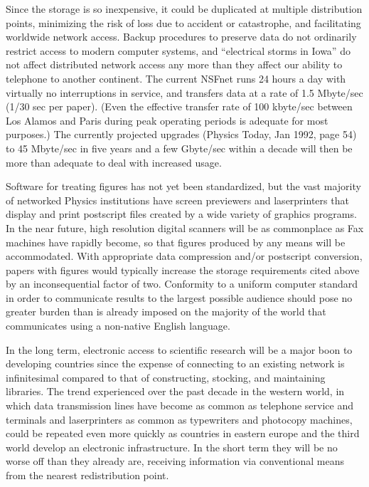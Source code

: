 Since the storage is so inexpensive, it could be duplicated at multiple
distribution points, minimizing the risk of loss due to accident or
catastrophe, and facilitating worldwide network access. Backup procedures
to preserve data do not ordinarily restrict access to modern computer
systems, and ``electrical storms in Iowa'' do not affect distributed
network access any more than they affect our ability to telephone to
another continent. The current NSFnet runs 24 hours a day with virtually
no interruptions in service, and transfers data at a rate of 1.5 Mbyte/sec
(1/30 sec per paper). (Even the effective transfer rate of 100 kbyte/sec
between Los Alamos and Paris during peak operating periods is adequate for
most purposes.) The currently projected upgrades (Physics Today, Jan 1992,
page 54) to 45 Mbyte/sec in five years and a few Gbyte/sec within a decade
will then be more than adequate to deal with increased usage.

Software for treating figures has not yet been standardized, but the vast
majority of networked Physics institutions have screen previewers and
laserprinters that display and print postscript files created by a wide
variety of graphics programs. In the near future, high resolution digital
scanners will be as commonplace as Fax machines have rapidly become, so
that figures produced by any means will be accommodated. With appropriate
data compression and/or postscript conversion, papers with figures would
typically increase the storage requirements cited above by an
inconsequential factor of two. Conformity to a uniform computer
standard in order to communicate results to the largest possible audience
should pose no greater burden than is already imposed on the majority of
the world that communicates using a non-native English language.

In the long term, electronic access to scientific research will be a major
boon to developing countries since the expense of connecting to an
existing network is infinitesimal compared to that of constructing,
stocking, and maintaining libraries. The trend experienced over the past
decade in the western world, in which data transmission lines have become as
common as telephone service and terminals and laserprinters as common
as typewriters and photocopy machines, could be repeated even more quickly
as countries in eastern europe and the third world develop an electronic
infrastructure. In the short term they will be no worse off than they
already are, receiving information via conventional means from the nearest
redistribution point.


